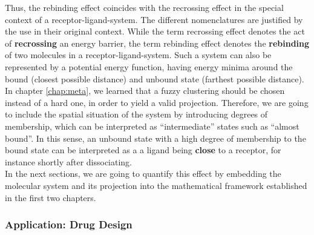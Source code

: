 Thus, the rebinding effect coincides with the recrossing effect in the special context of a receptor-ligand-system. %
The different nomenclatures are justified by the use in their original context. While the term recrossing effect denotes the act of \textbf{recrossing} an energy barrier, the term rebinding effect denotes the \textbf{rebinding} of two molecules in a receptor-ligand-system. Such a system can also be represented by a potential energy function, having energy minima around the bound (closest possible distance) and unbound state (farthest possible distance).
\\

In chapter \ref{chap:meta}, we learned that a fuzzy clustering should be chosen instead of a hard one, in order to yield a valid projection.
Therefore, we are going to include the spatial situation of the system by introducing degrees of membership, which can be interpreted as ``intermediate'' states such as ``almost bound''.
In this sense, an unbound state with a high degree of membership to the bound state can be interpreted as a a ligand being \textbf{close} to a receptor, for instance shortly after dissociating.
\\

In the next sections, we are going to quantify this effect by embedding the molecular system and its projection into the mathematical framework established in the first two chapters.

\subsubsection*{Application: Drug Design} %


